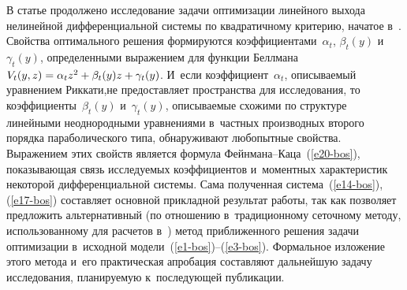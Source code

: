 \begin{multicols}{2}
     В статье продолжено исследование задачи оптимизации линейного 
выхода нелинейной дифференциальной системы по квадратичному 
критерию,\linebreak
 начатое в~\cite{1-bos}. Свойства оптимального решения 
формируются коэффициентами~$\alpha_t$, $\beta_t(y)$ и~$\gamma_t(y)$, 
определенными выражением для функции Беллмана $V_t (y,z)\hm= \alpha_t 
z^2\hm+  \beta_t(y)z\hm+ \gamma_t(y)$. И~если коэффициент~$\alpha_t$, 
описываемый уравнением Риккати,\linebreak не предоставляет пространства для 
исследования, то коэффициенты~$\beta_t(y)$ и~$\gamma_t(y)$, опи\-сы\-ва\-емые 
схожими по структуре линейными неоднородными уравнениями в~част\-ных 
производных второго порядка параболического типа, обнаруживают 
любопытные свойства. Выражением этих свойств является формула  
Фейн\-ма\-на--Ка\-ца~(\ref{e20-bos}), показывающая связь исследуемых 
коэффициентов и~моментных характеристик некоторой дифференциальной 
сис\-те\-мы. Сама полученная сис\-те\-ма~(\ref{e14-bos}), (\ref{e17-bos}) со\-став\-ля\-ет 
основной прикладной результат работы, так как позволяет предложить 
альтернативный (по отношению в~традиционному сеточному методу, 
использованному для расчетов в~\cite{2-bos}) метод приближенного решения 
задачи оптимизации в~исходной модели~(\ref{e1-bos})--(\ref{e3-bos}). 
Формальное изложение этого метода и~его практическая апробация 
со\-став\-ля\-ют дальнейшую задачу исследования, планируемую к~последующей 
пуб\-ли\-ка\-ции.
     

\end{multicols}
